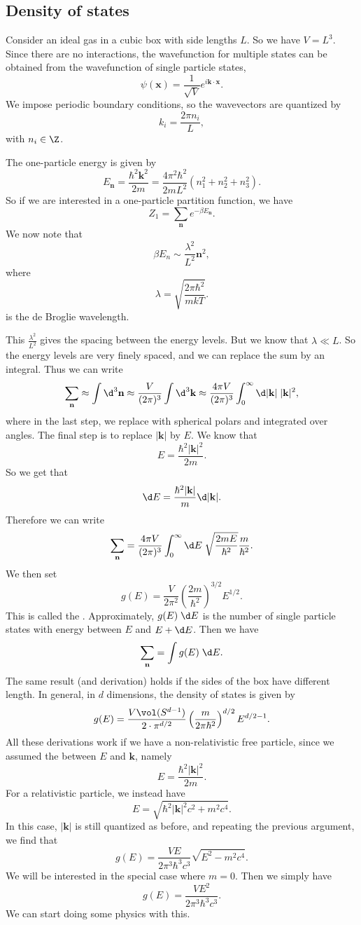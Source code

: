 \documentclass[a4paper]{article}
\begin{document}
\subsection{Density of states}
Consider an ideal gas in a cubic box with side lengths $L$. So we have $V = L^3$. Since there are no interactions, the wavefunction for multiple states can be obtained from the wavefunction of single particle states,
\[
  \psi(\mathbf{x}) = \frac{1}{\sqrt{V}} e^{i\mathbf{k}\cdot \mathbf{x}}.
\]
We impose periodic boundary conditions, so the wavevectors are quantized by
\[
  k_i = \frac{2\pi n_i}{L},
\]
with $n_i \in \Z$.

The one-particle energy is given by
\[
  E_\mathbf{n} = \frac{\hbar^2 \mathbf{k}^2}{2m} = \frac{4\pi^2 \hbar^2}{2mL^2}(n_1^2 + n_2^2 + n_3^2).
\]
So if we are interested in a one-particle partition function, we have
\[
  Z_1 = \sum_\mathbf{n} e^{-\beta E_\mathbf{n}}.
\]
We now note that
\[
  \beta E_n \sim \frac{\lambda^2}{L^2}\mathbf{n}^2,
\]
where
\[
  \lambda = \sqrt{\frac{2\pi \hbar^2}{mkT}}.
\]
is the de Broglie wavelength.

This $\frac{\lambda^2}{L^2}$ gives the spacing between the energy levels. But we know that $\lambda \ll L$. So the energy levels are very finely spaced, and we can replace the sum by an integral. Thus we can write
\[
  \sum_\mathbf{n} \approx \int \d^3 \mathbf{n} \approx \frac{V}{(2\pi)^3} \int \d^3 \mathbf{k} \approx \frac{4\pi V}{(2\pi)^3} \int_0^\infty \d |\mathbf{k}|\; |\mathbf{k}|^2,
\]
where in the last step, we replace with spherical polars and integrated over angles. The final step is to replace $|\mathbf{k}|$ by $E$. We know that
\[
  E = \frac{\hbar^2 |\mathbf{k}|^2}{2m}.
\]
So we get that
\[
  \d E = \frac{\hbar^2 |\mathbf{k}|}{m} \d |\mathbf{k}|.
\]
Therefore we can write
\[
  \sum_\mathbf{n} = \frac{4\pi V}{(2\pi)^3} \int_0^\infty \d E\; \sqrt{\frac{2mE}{\hbar^2}}\frac{m}{\hbar^2}.
\]
We then set
\[
  g(E) = \frac{V}{2\pi^2} \left(\frac{2m}{\hbar^2}\right)^{3/2} E^{1/2}.
\]
This is called the . Approximately, $g(E) \;\d E$ is the number of single particle states with energy between $E$ and $E + \d E$. Then we have
\[
  \sum_\mathbf{n} = \int g(E)\;\d E.
\]
The same result (and derivation) holds if the sides of the box have different length. In general, in $d$ dimensions, the density of states is given by
\[
  g(E) = \frac{V \vol(S^{d - 1})}{2\cdot \pi^{d/2}} \left(\frac{m}{2\pi \hbar^2}\right)^{d/2} E^{d/2 - 1}.
\]
All these derivations work if we have a non-relativistic free particle, since we assumed the  between $E$ and $\mathbf{k}$, namely
\[
  E = \frac{\hbar^2 |\mathbf{k}|^2}{2m}.
\]
For a relativistic particle, we instead have
\[
  E = \sqrt{\hbar^2 |\mathbf{k}|^2 c^2 + m^2c^4}.
\]
In this case, $|\mathbf{k}|$ is still quantized as before, and repeating the previous argument, we find that
\[
  g(E) = \frac{VE}{2\pi^3 \hbar^3 c^3} \sqrt{E^2 - m^2 c^4}.
\]
We will be interested in the special case where $m = 0$. Then we simply have
\[
  g(E) = \frac{VE^2}{2\pi^3 \hbar^3 c^3}.
\]
We can start doing some physics with this.
\end{document}
